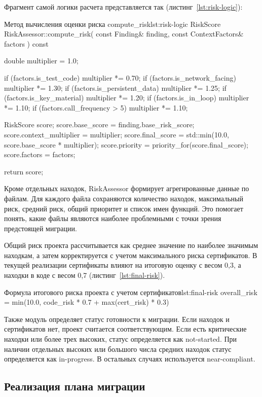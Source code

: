\documentclass{itmo-vkr}
\begin{document}
Фрагмент самой логики расчета представляется так (листинг~\ref{lst:risk-logic}):

	
\begin{itmolisting}[C++]{Метод вычисления оценки риска compute\_risk}{lst:risk-logic}
RiskScore RiskAssessor::compute_risk(
const Finding& finding,
const ContextFactors& factors
) const {
	double multiplier = 1.0;
	
	if (factors.is_test_code) {
		multiplier *= 0.70;
	}
	if (factors.is_network_facing) {
		multiplier *= 1.30;
	}
	if (factors.is_persistent_data) {
		multiplier *= 1.25;
	}
	if (factors.is_key_material) {
		multiplier *= 1.20;
	}
	if (factors.is_in_loop) {
		multiplier *= 1.10;
	}
	if (factors.call_frequency > 5) {
		multiplier *= 1.10;
	}
	
	RiskScore score;
	score.base_score = finding.base_risk_score;
	score.context_multiplier = multiplier;
	score.final_score =
	std::min(10.0, score.base_score * multiplier);
	score.priority = priority_for(score.final_score);
	score.factors = factors;
	
	return score;
}
\end{itmolisting}


Кроме отдельных находок, RiskAssessor формирует агрегированные данные по файлам. Для каждого файла сохраняются количество находок, максимальный риск, средний риск, общий приоритет и список имен функций. Это помогает понять, какие файлы являются наиболее проблемными с точки зрения предстоящей миграции.

Общий риск проекта рассчитывается как среднее значение по наиболее значимым находкам, а затем корректируется с учетом максимального риска сертификатов. В текущей реализации сертификаты влияют на итоговую оценку с весом 0,3, а находки в коде с весом 0,7 (листинг~\ref{lst:final-risk}).

\begin{itmolisting}[C++]{Формула итогового риска проекта с учетом сертификатов}{lst:final-risk}
overall_risk = min(10.0, code_risk * 0.7 + max(cert_risk) * 0.3)
\end{itmolisting}

Также модуль определяет статус готовности к миграции. Если находок и сертификатов нет, проект считается соответствующим. Если есть критические находки или более трех высоких, статус определяется как not-started. При наличии отдельных высоких или большого числа средних находок статус определяется как in-progress. В остальных случаях используется near-compliant.

\subsection{Реализация плана миграции}
\end{document}
